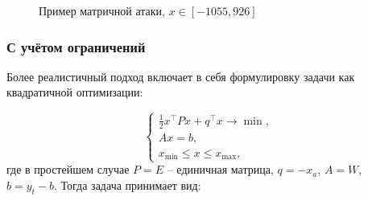 \begin{figure}[ht]
    \caption{Пример матричной атаки, \(x \in [-1055, 926]\)}
    \label{fig:matrix_attack_example}
\end{figure}

\subsubsection{С учётом ограничений}

Более реалистичный подход включает в себя формулировку задачи как квадратичной оптимизации:

\[
\begin{cases}
    \frac{1}{2} x^\top P x + q^\top x \rightarrow \min,\\
    Ax = b,\\
    x_{\min} \leq x \leq x_{\max},
\end{cases}
\]
где в простейшем случае \(P = E\) -- единичная матрица, \(q = -x_a\), \(A = W\), \(b = y_t - b\). Тогда задача принимает вид:

